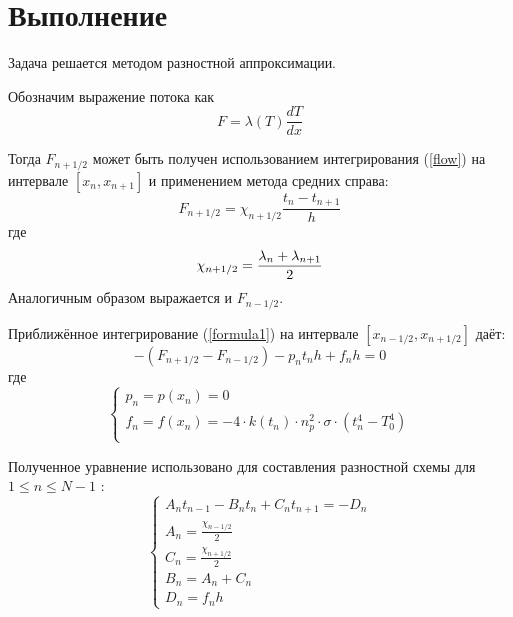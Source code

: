 \chapter*{Выполнение}

Задача решается методом разностной аппроксимации.

Обозначим выражение потока как
\begin{equation}\label{flow}
	F = \lambda(T)\frac{dT}{dx}
\end{equation}

Тогда $F_{n+1/2}$ может быть получен использованием интегрирования (\ref{flow}) на интервале $[x_n, x_{n+1}]$ и применением метода средних справа:
\begin{equation}
	F_{n+1/2} = \chi_{n+1/2} \dfrac{t_{n} - t_{n+1}}{h}
\end{equation}
где
\begin{equation}
	\chi_{n+1/2} = \dfrac{\lambda_{n} + \lambda_{n+1}}{2} \\
\end{equation}
Аналогичным образом выражается и $F_{n-1/2}$. 


Приближённое интегрирование (\ref{formula1}) на интервале $[x_{n-1/2}, x_{n+1/2}]$ даёт:
\begin{equation}\label{main_eq_integr}
	-(F_{n+1/2} - F_{n-1/2}) - p_n t_n h + f_nh = 0
\end{equation}
где
\begin{equation}\label{fp_eq}
	\begin{cases}
		p_n = p(x_n) = 0 \\ 
		f_n = f(x_n) = -4 \cdot k(t_n) \cdot n_{p}^{2} \cdot \sigma \cdot (t_n^4 - T_0^4)\\
	\end{cases}
\end{equation}

Полученное уравнение использовано для составления разностной схемы для $1 \leq n \leq N-1$ :
\begin{equation}
	\begin{cases}
		A_n t_{n-1} - B_n t_{n} + C_n t_{n+1} = -D_n \\
		A_n = \frac{\chi_{n-1/2}}{2} \\
		C_n = \frac{\chi_{n+1/2}}{2} \\
		B_n = A_n + C_n \\
		D_n = f_nh
	\end{cases}
\end{equation}

